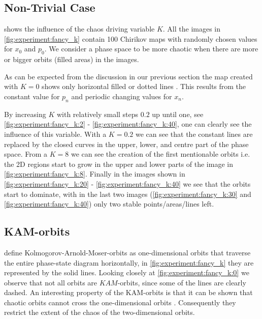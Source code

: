 \subsection{Non-Trivial Case}
\label{ss:b:nontrivial}
 shows the influence of the chaos driving variable $K$. All the images in \cref{fig:experiment:fancy_k} contain 100 Chirikov maps with randomly chosen values for $x_0$ and $p_0$. We consider a phase space to be more chaotic when there are more or bigger orbits (filled areas) in the images. 

As can be expected from the discussion in our previous section the map created with $K = 0$ shows only horizontal filled or dotted lines . This results from the constant value for $p_n$ and periodic changing values for $x_n$. 

By increasing $K$ with relatively small steps $0.2$ up until one, see \cref{fig:experiment:fancy_k:2} - \ref{fig:experiment:fancy_k:40}, one can clearly see the influence of this variable. With a $K = 0.2$ we can see that the constant lines are replaced by the closed curves in the upper, lower, and centre part of the phase space. From a $K = 8$ we can see the creation of the first mentionable orbits i.e. the 2D regions start to grow in the upper and lower parts of the image in \cref{fig:experiment:fancy_k:8}.  Finally in the images shown in \cref{fig:experiment:fancy_k:20} - \ref{fig:experiment:fancy_k:40} we see that the orbits start to dominate, with in the last two images (\cref{fig:experiment:fancy_k:30} and \ref{fig:experiment:fancy_k:40}) only two stable points/areas/lines left. 




\subsection{KAM-orbits}
\label{ss:b:kam}
\citeauthor{kenzel1997physics} define Kolmogorov-Arnold-Moser-orbits as one-dimensional orbits that traverse the entire phase-state diagram horizontally, in \cref{fig:experiment:fancy_k} they are represented by the solid lines. Looking closely at \cref{fig:experiment:fancy_k:0} we observe that not all orbits are $KAM$-orbits, since some of the lines are clearly dashed. An interesting property of the KAM-orbits is that it can be shown that chaotic orbits cannot cross the one-dimensional orbits \cite{kenzel1997physics}. Consequently they restrict the extent of the chaos of the two-dimensional orbits.\\

